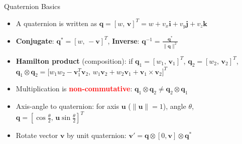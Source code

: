 \begin{frame}{Quaternion Basics}
    \begin{itemize}
        \setlength{\itemsep}{0.55em}
        \setlength{\parskip}{0.2em}
        \item A quaternion is written as $\mathbf{q} = [w,\,\mathbf{v}]^T = w + v_x\mathbf{i} + v_y\mathbf{j} + v_z\mathbf{k}$
        \item \textbf{Conjugate}: $\mathbf{q}^* = [w,\,-\mathbf{v}]^T$, \quad \textbf{Inverse}: $\mathbf{q}^{-1}=\frac{\mathbf{q}^*}{\|\mathbf{q}\|^2}$
        \item \textbf{Hamilton product} (composition):
        if $\mathbf{q}_1=[w_1,\,\mathbf{v}_1]^T$, $\mathbf{q}_2=[w_2,\,\mathbf{v}_2]^T$,
        $\mathbf{q}_1\otimes\mathbf{q}_2=
        \big[w_1w_2-\mathbf{v}_1^T\mathbf{v}_2,\,
        w_1\mathbf{v}_2+w_2\mathbf{v}_1+\mathbf{v}_1\times\mathbf{v}_2\big]^T$
        \item Multiplication is \textcolor{red}{\textbf{non-commutative}}: $\mathbf{q}_1\otimes\mathbf{q}_2 \neq \mathbf{q}_2\otimes\mathbf{q}_1$
        \item Axis-angle to quaternion: for axis $\mathbf{u}$ ($\|\mathbf{u}\|=1$), angle $\theta$,
        $\mathbf{q}=\left[\cos\frac{\theta}{2},\,\mathbf{u}\sin\frac{\theta}{2}\right]^T$
        \item Rotate vector $\mathbf{v}$ by unit quaternion: $\mathbf{v}'=\mathbf{q}\otimes[0,\mathbf{v}]\otimes\mathbf{q}^*$
    \end{itemize}
\end{frame}

